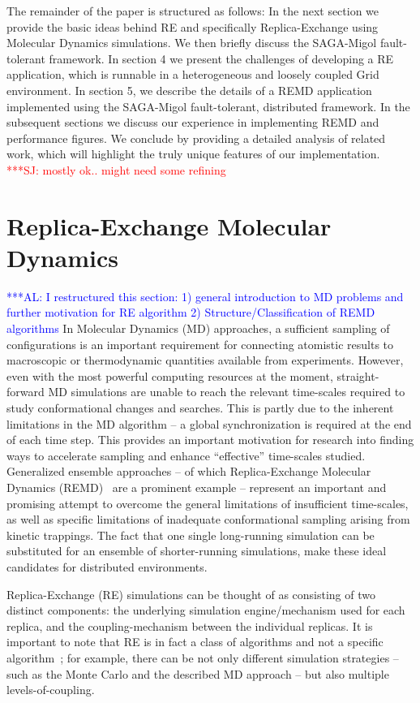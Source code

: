 \documentclass{rspublic}
\newcommand{\alnote}[1]{ {\textcolor{blue} { ***AL: #1 }}}
\newcommand{\jhanote}[1]{ {\textcolor{red} { ***SJ: #1 }}}
\newcommand{\alnote}[1]{}
\newcommand{\jhanote}[1]{}
\begin{document}
The remainder of the paper is structured as follows: In the next
section we provide the basic ideas behind RE and specifically
Replica-Exchange using Molecular Dynamics simulations.  We then
briefly discuss the SAGA-Migol fault-tolerant framework. In section 4
we present the challenges of developing a RE application,
which is runnable in a heterogeneous and loosely coupled Grid
environment.  In section 5, we describe the details of a REMD
application implemented using the SAGA-Migol fault-tolerant, distributed
framework. In the subsequent sections we discuss our experience in
implementing REMD and performance figures. We conclude by providing a
detailed analysis of related work, which will highlight the truly
unique features of our implementation.  \jhanote{mostly ok.. might
  need some refining}

\section{Replica-Exchange Molecular Dynamics}
\alnote{I restructured this section: 1) general introduction to MD
  problems and further motivation for RE algorithm 2)
  Structure/Classification of REMD algorithms}  In Molecular
Dynamics (MD) approaches, a sufficient sampling of configurations is
an important requirement for connecting atomistic results to
macroscopic or thermodynamic quantities available from experiments.
However, even with the most powerful computing resources at the
moment, straight-forward MD simulations are unable to reach the
relevant time-scales required to study conformational changes and
searches. This is partly due to the inherent limitations in the MD
algorithm -- a global synchronization is required at the end of each
time step.  This provides an important motivation for research into
finding ways to accelerate sampling and enhance ``effective''
time-scales studied. Generalized ensemble approaches -- of which
Replica-Exchange Molecular Dynamics (REMD)~\citep{Sugita:1999rm} are a
prominent example -- represent an important and promising attempt to
overcome the general limitations of insufficient time-scales, as well
as specific limitations of inadequate conformational sampling arising
from kinetic trappings.  The fact that one single long-running
simulation can be substituted for an ensemble of shorter-running
simulations, make these ideal candidates for distributed environments.

Replica-Exchange (RE) simulations can be thought of as consisting of
two distinct components: the underlying simulation engine/mechanism
used for each replica, and the coupling-mechanism between the
individual replicas.  It is important to note that RE is in fact a
class of algorithms and not a specific
algorithm~\citep{dpa-paper}; for example, there can be not only
different simulation strategies -- such as the Monte Carlo and the
described MD approach -- but also multiple levels-of-coupling.  
\end{document}
